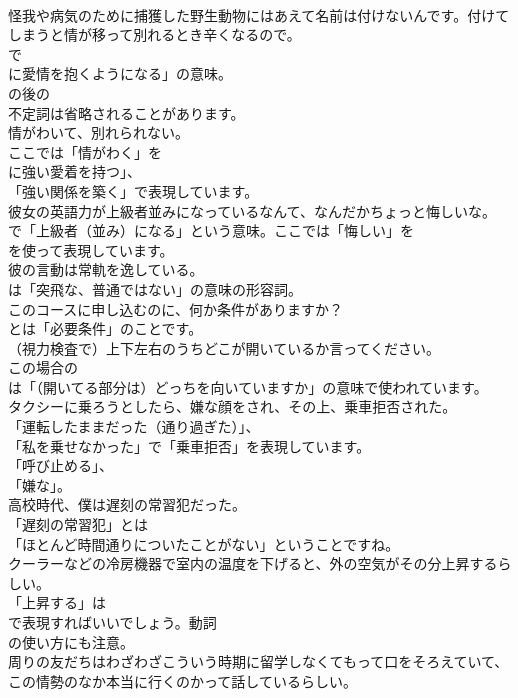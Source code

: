 \documentclass[8pt]{extreport}
\begin{document}
\begin{CJK}{UTF8}{min}
\\	怪我や病気のために捕獲した野生動物にはあえて名前は付けないんです。付けてしまうと情が移って別れるとき辛くなるので。 
\\	で
\\	に愛情を抱くようになる」の意味。
\\	の後の
\\	不定詞は省略されることがあります。	
\\	情がわいて、別れられない。 
\\	ここでは「情がわく」を
\\	に強い愛着を持つ」、
\\	「強い関係を築く」で表現しています。	
\\	彼女の英語力が上級者並みになっているなんて、なんだかちょっと悔しいな。 
\\	で「上級者（並み）になる」という意味。ここでは「悔しい」を
\\	を使って表現しています。	
\\	彼の言動は常軌を逸している。 
\\	は「突飛な、普通ではない」の意味の形容詞。	
\\	このコースに申し込むのに、何か条件がありますか？ 
\\	とは「必要条件」のことです。	
\\	（視力検査で）上下左右のうちどこが開いているか言ってください。 
\\	この場合の
\\	は「（開いてる部分は）どっちを向いていますか」の意味で使われています。	
\\	タクシーに乗ろうとしたら、嫌な顔をされ、その上、乗車拒否された。 
\\	「運転したままだった（通り過ぎた）」、
\\	「私を乗せなかった」で「乗車拒否」を表現しています。
\\	「呼び止める」、
\\	「嫌な」。	
\\	高校時代、僕は遅刻の常習犯だった。 
\\	「遅刻の常習犯」とは
\\	「ほとんど時間通りについたことがない」ということですね。	
\\	クーラーなどの冷房機器で室内の温度を下げると、外の空気がその分上昇するらしい。 
\\	「上昇する」は 
\\	で表現すればいいでしょう。動詞 
\\	の使い方にも注意。	
\\	周りの友だちはわざわざこういう時期に留学しなくてもって口をそろえていて、この情勢のなか本当に行くのかって話しているらしい。 

\end{CJK}
\end{document}
